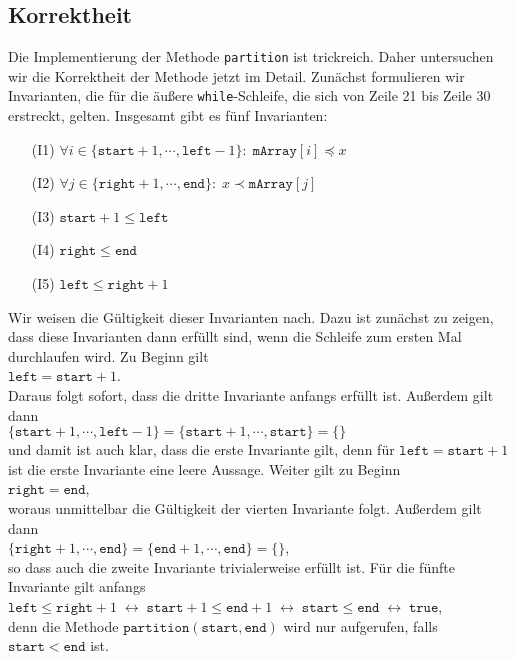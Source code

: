 \subsection{Korrektheit}
Die Implementierung der Methode \texttt{partition} ist trickreich.  Daher untersuchen wir
die Korrektheit der Methode jetzt im Detail.  Zun\"achst formulieren wir Invarianten, die
f\"ur die \"au\ss{}ere \texttt{while}-Schleife, die sich von Zeile 21 bis Zeile 30 erstreckt,
gelten.  Insgesamt gibt es f\"unf Invarianten:
\begin{enumerate}
\item[(I1)] $\forall i \in \{ \mathtt{start}+1, \cdots, \mathtt{left} - 1 \} \colon\; \mathtt{mArray}[i] \preceq x$
\item[(I2)] $\forall j \in \{ \mathtt{right}+1, \cdots, \mathtt{end} \} \colon\; x \prec \mathtt{mArray}[j]$
\item[(I3)] $\mathtt{start}+1 \leq \mathtt{left}$ 
\item[(I4)] $\mathtt{right} \leq \mathtt{end}$ 
\item[(I5)] $\mathtt{left} \leq \mathtt{right} + 1$
\end{enumerate}
Wir weisen die G\"ultigkeit dieser Invarianten nach.  Dazu ist zun\"achst zu zeigen,
dass diese Invarianten dann erf\"ullt sind, wenn die Schleife zum ersten Mal durchlaufen wird.
Zu Beginn gilt \\[0.1cm]
\hspace*{1.3cm} $\texttt{left} = \mathtt{start} + 1$. \\[0.1cm]
Daraus folgt sofort, dass die dritte Invariante anfangs erf\"ullt ist.  Au\ss{}erdem gilt dann \\[0.1cm]
\hspace*{1.3cm} 
$\{ \mathtt{start}+1, \cdots, \mathtt{left}-1 \} = \{ \mathtt{start}+1, \cdots, \mathtt{start} \} = \{\}$
\\[0.1cm]
und damit ist auch klar, dass die erste Invariante gilt, denn f\"ur $\mathtt{left} = \mathtt{start}+1$
ist die erste Invariante eine leere Aussage.  Weiter gilt zu Beginn \\[0.1cm]
\hspace*{1.3cm} $\mathtt{right} = \mathtt{end}$,
\\[0.1cm]
woraus unmittelbar die G\"ultigkeit der vierten Invariante folgt.  Au\ss{}erdem gilt dann \\[0.1cm]
\hspace*{1.3cm} 
$\{ \mathtt{right}+1, \cdots, \mathtt{end} \} = \{ \mathtt{end}+1, \cdots, \mathtt{end} \} = \{\}$,
\\[0.1cm]
so dass auch die zweite Invariante trivialerweise erf\"ullt ist.  F\"ur die f\"unfte Invariante gilt anfangs
 \\[0.1cm]
\hspace*{1.3cm} 
$\mathtt{left} \leq \mathtt{right} + 1 \;\leftrightarrow\; \mathtt{start} + 1 \leq \mathtt{end} + 1 \;\leftrightarrow\;
  \mathtt{start} \leq \mathtt{end} \;\leftrightarrow\; \mathtt{true}$,
\\[0.1cm]
denn die Methode $\texttt{partition}(\texttt{start}, \texttt{end})$ wird nur aufgerufen,
falls $\mathtt{start} < \mathtt{end}$ ist.
\vspace*{0.3cm}


